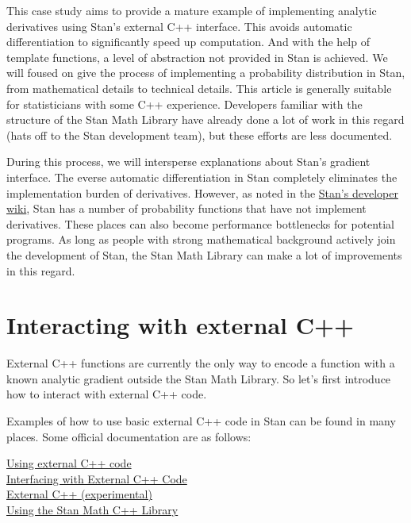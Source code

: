 \documentclass[11pt]{article}
\begin{document}
\begin{comment}
For example, Stan haven't implement the derivatives of \href{https://github.com/stan-dev/math/blob/develop/stan/math/prim/prob/neg_binomial_2_lcdf.hpp}{lcdf} and \href{https://github.com/stan-dev/math/blob/develop/stan/math/prim/prob/neg_binomial_2_lccdf.hpp}{lccdf} of the negative binomial distribution (alternative parameterization).
\end{comment}
This case study aims to provide a mature example of implementing analytic derivatives using Stan's external C++ interface. This avoids automatic differentiation to significantly speed up computation. And with the help of template functions, a level of abstraction not provided in Stan is achieved. We will foused on give the process of implementing a  probability distribution in Stan, from mathematical details to technical details. This article is generally suitable for statisticians with some C++ experience. Developers familiar with the structure of the Stan Math Library have already done a lot of work in this regard (hats off to the Stan development team), but these efforts are less documented.


During this process, we will intersperse explanations about Stan's gradient interface. The everse automatic differentiation in Stan completely eliminates the implementation burden of derivatives. However, as noted in the \href{https://github.com/stan-dev/stan/wiki/Contributing-to-Stan-Without-C-Plus-Plus--Experience}{Stan's developer wiki}, Stan has a number of probability functions that have not implement derivatives. These places can also become performance bottlenecks for potential programs. As long as people with strong mathematical background actively join the development of Stan, the Stan Math Library can make a lot of improvements in this regard.




\section{Interacting with external C++}

External C++ functions are currently the only way to encode a function with a known analytic gradient outside the Stan Math Library. So let’s first introduce how to interact with external C++ code.

Examples of how to use basic external C++ code in Stan can be found in many places. Some official documentation are as follows:

\href{https://mc-stan.org/docs/cmdstan-guide/using-external-cpp-code.html}{Using external C++ code}\\
\href{https://mc-stan.org/rstan/articles/external.html}{Interfacing with External C++ Code}\\
\href{https://pystan2.readthedocs.io/en/latest/external_cpp.html}{External C++ (experimental)}\\
\href{https://cran.r-project.org/web/packages/StanHeaders/vignettes/stanmath.html}{Using the Stan Math C++ Library}
\end{document}
